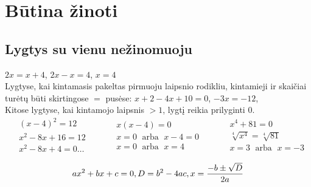 \documentclass[fleqn]{article} %
\DeclareMathOperator{\arba}{\ arba\ }
\begin{document}

\renewcommand{\tablename}{Lentelė}
\renewcommand{\figurename}{Iliustracija}
\renewcommand{\vec}{\vv}
\pagestyle{plain}
\texttt{}


\section{Būtina žinoti}

\subsection{Lygtys su vienu nežinomuoju}
$2x = x + 4$, $2x - x = 4$, $x = 4$ \\
Lygtyse, kai kintamasis pakeltas pirmuoju laipsnio rodikliu, kintamieji ir skaičiai turėtų būti skirtingose $=$ pusėse:
$x + 2 - 4x + 10 = 0$, $-3x = -12$, \\
Kitose lygtyse, kai kintamojo laipsnis $ > 1$, lygtį reikia prilyginti $0$.
\begin{equation}    
\begin{aligned}
    & (x - 4)^2 = 12 \\
    & x^2 - 8x + 16 = 12 \\
    & x^2 - 8x + 4 = 0 \dots
\end{aligned}
\qquad
\begin{aligned}
    & x(x - 4) = 0 \\
    & x = 0\arba x - 4 = 0 \\
    & x = 0\arba x = 4    
\end{aligned}
\qquad
\begin{aligned}    
    & x^4 + 81 = 0 \\
    & \sqrt[4]{x^4} = \sqrt[4]{81} \\
    & x = 3 \arba  x = -3
\end{aligned}
\end{equation}

\begin{equation}
    ax^2 + bx + c = 0, \\
    D = b^2 - 4ac,     \\
    x = \frac{-b \pm \sqrt{D}}{2a}
\end{equation}
\end{document}
